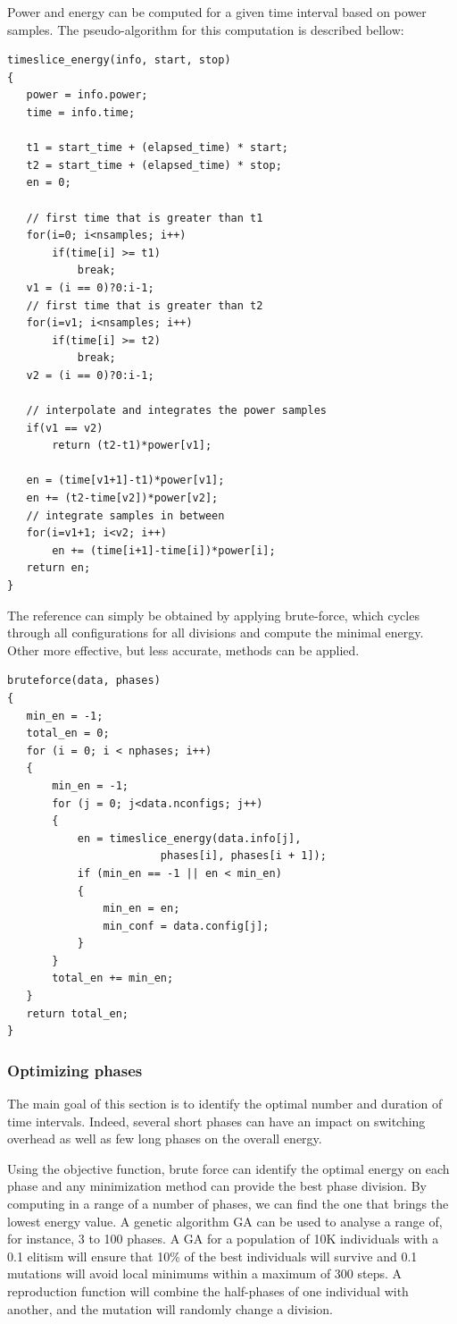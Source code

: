 Power and energy can be computed for a given time interval based on power samples. The pseudo-algorithm for this computation is described bellow:

\begin{lstlisting}
timeslice_energy(info, start, stop)
{
   power = info.power;
   time = info.time;
   
   t1 = start_time + (elapsed_time) * start;
   t2 = start_time + (elapsed_time) * stop;
   en = 0;

   // first time that is greater than t1
   for(i=0; i<nsamples; i++)
       if(time[i] >= t1)
           break;
   v1 = (i == 0)?0:i-1;
   // first time that is greater than t2
   for(i=v1; i<nsamples; i++)
       if(time[i] >= t2)
           break;
   v2 = (i == 0)?0:i-1;
 
   // interpolate and integrates the power samples
   if(v1 == v2)
       return (t2-t1)*power[v1];
 
   en = (time[v1+1]-t1)*power[v1];
   en += (t2-time[v2])*power[v2];
   // integrate samples in between
   for(i=v1+1; i<v2; i++)
       en += (time[i+1]-time[i])*power[i];
   return en;
}
\end{lstlisting}

The reference can simply be obtained by applying brute-force, which cycles through all configurations for all divisions and compute the minimal energy. Other more effective, but less accurate, methods can be applied.

\begin{lstlisting}
bruteforce(data, phases)
{
   min_en = -1;
   total_en = 0;
   for (i = 0; i < nphases; i++)
   {
       min_en = -1;
       for (j = 0; j<data.nconfigs; j++)
       {
           en = timeslice_energy(data.info[j], 
                        phases[i], phases[i + 1]);
           if (min_en == -1 || en < min_en)
           {
               min_en = en;
               min_conf = data.config[j];
           }
       }
       total_en += min_en;
   }
   return total_en;
}
\end{lstlisting}

\subsubsection{Optimizing phases}
The main goal of this section is to identify the optimal number and duration of time intervals. Indeed, several short phases can have an impact on switching overhead as well as few long phases on the overall energy. 

Using the objective function, brute force can identify the optimal energy on each phase and any minimization method can provide the best phase division. By computing in a range of a number of phases, we can find the one that brings the lowest energy value. A genetic algorithm GA can be used to analyse a range of, for instance, 3 to 100 phases. A GA for a population of 10K individuals with a 0.1 elitism will ensure that 10\% of the best individuals will survive and 0.1 mutations will avoid local minimums within a maximum of 300 steps. A reproduction function will combine the half-phases of one individual with another, and the mutation will randomly change a division.

